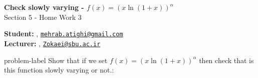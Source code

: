 	






		\begin{Large}
		\textsf{\textbf{Check slowly varying - $f(x) = (x\ln(1+x))^\alpha$}}\\
		Section 5 - Home Work 3
	\end{Large}
	
	\vspace{1ex}
	
	\textsf{\textbf{Student:}} , \href{mailto:mehrab.atighi@gmail.com}{\texttt{mehrab.atighi@gmail.com}}\\
	\textsf{\textbf{Lecturer:}} , \href{mailto:Zokaei@sbu.ac.ir}{\texttt{Zokaei@sbu.ac.ir}}
	
	
	\vspace{2ex}
	
	\begin{problem}{}{problem-label}
		Show that if we set $f(x) = (x\ln(1+x))^\alpha$ then check that is this function slowly varying or not.\cite{Embrechts.etal1997}:
	\end{problem}
	
